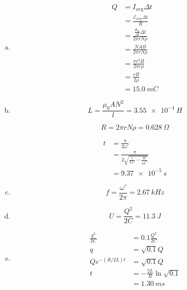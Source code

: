 \documentclass{article}
\begin{document}
\begin{enumerate}[(a)]
  \item

        \begin{align*}
          Q & = I_\text{avg} \Delta t                                   \\
            & = \frac{\mathcal{E}_\text{avg} \Delta t}{R}               \\
            & = \frac{\frac{\Phi_B}{\Delta t} \Delta t}{2 \pi r N \rho} \\
            & = \frac{N A B}{2 \pi r N \rho}                            \\
            & = \frac{\pi r^2 B}{2 \pi r \rho}                          \\
            & = \frac{r B}{2 \rho}                                      \\
            & = \qty{15.0}{mC}
        \end{align*}

  \item

        \[L = \frac{\mu_0 A N^2}{l} = \qty{3.55e-4}{H}\]

        \[R = 2 \pi r N \rho = \qty{0.628}{\Omega}\]

        \begin{align*}
          t & = \frac{\pi}{2 \omega'}                                  \\
            & = \frac{\pi}{2 \sqrt{\frac{1}{L C} - \frac{R^2}{4 L^2}}} \\
            & = \qty{9.37e-5}{s}
        \end{align*}

  \item \[f = \frac{\omega'}{2 \pi} = \qty{2.67}{kHz}\]

  \item \[U = \frac{Q^2}{2 C} = \qty{11.3}{J}\]

  \item

        \begin{align*}
          \frac{q^2}{2 C}   & = 0.1 \frac{Q^2}{2 C}           \\
          q                 & = \sqrt{0.1} Q                  \\
          Q e^{-(R / 2L) t} & = \sqrt{0.1} Q                  \\
          t                 & = -\frac{2 L}{R} \ln \sqrt{0.1} \\
                            & = \qty{1.30}{ms}
        \end{align*}
\end{enumerate}
\end{document}
